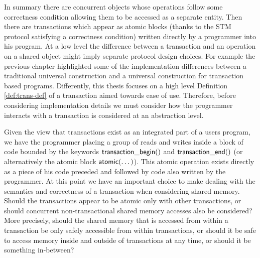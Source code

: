 In summary there are concurrent objects whose operations follow some correctness condition
allowing them to be accessed as a separate entity.
Then there are transactions which appear as atomic blocks (thanks to the STM protocol
satisfying a correctness condition) written directly by a programmer into his program.
At a low level the difference between a transaction and an operation
on a shared object might imply separate protocol design choices.
For example the previous chapter highlighted some of the implementation
differences between a traditional universal construction and a
universal construction for transaction based programs.
Differently, this thesis focuses on a high level Definition \ref{def:trans-def}
of a transaction aimed towards ease of use.
Therefore, before considering implementation details we must consider
how the programmer interacts with a transaction is considered at an abstraction level.


Given the view that transactions exist as an integrated part of
a users program, we have
the programmer placing a group of reads and writes
inside a block of code bounded by the keywords $\act{transaction\_begin}()$ and
$\act{transaction\_end}()$ (or alternatively the atomic block $\act{atomic}(\dots)$).
This atomic operation exists directly as a piece of his code preceded
and followed by code also written by the programmer.
At this point we have an important choice to make dealing with the
semantics and correctness of a transaction when considering shared memory.
Should the transactions appear to be atomic only with other transactions, or should
concurrent non-transactional shared memory accesses also be considered?
More precisely, should the shared memory that is accessed from within a transaction
be only safely accessible from within transactions, or should it be
safe to access memory inside and outside of transactions at any time,
or should it be something in-between?

